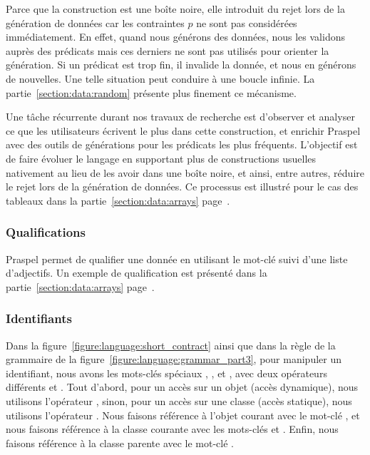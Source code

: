 Parce que la construction  est une boîte noire, elle introduit du rejet
lors de la génération de données car les contraintes $p$ ne sont pas considérées
immédiatement. En effet, quand nous générons des données, nous les validons
auprès des prédicats mais ces derniers ne sont pas utilisés pour orienter la
génération. Si un prédicat est trop fin, il invalide la donnée, et nous en
générons de nouvelles. Une telle situation peut conduire à une boucle infinie.
La partie~\ref{section:data:random} présente plus finement ce mécanisme.

Une tâche récurrente durant nos travaux de recherche est d'observer et analyser
ce que les utilisateurs écrivent le plus dans cette construction, et enrichir
Praspel avec des outils de générations pour les prédicats les plus fréquents.
L'objectif est de faire évoluer le langage en supportant plus de constructions
usuelles nativement au lieu de les avoir dans une boîte noire, et ainsi, entre
autres, réduire le rejet lors de la génération de données. Ce processus est
illustré pour le cas des tableaux dans la partie~\ref{section:data:arrays}
page~\pageref{section:data:arrays}.

\subsubsection{Qualifications}

Praspel permet de qualifier une donnée en utilisant le mot-clé  suivi
d'une liste d'adjectifs. Un exemple de qualification est présenté dans la
partie~\ref{section:data:arrays} page~\pageref{section:data:arrays}.

\subsubsection{Identifiants}

Dans la figure~\ref{figure:language:short_contract} ainsi que dans la règle
 de la grammaire de la
figure~\ref{figure:language:grammar_part3}, pour manipuler un identifiant, nous
avons les mots-clés spéciaux , ,  et
, avec deux opérateurs différents \code{->} et \code{::}. Tout
d'abord, pour un accès sur un objet (accès dynamique), nous utilisons
l'opérateur \code{->}, sinon, pour un accès sur une classe (accès statique),
nous utilisons l'opérateur \code{::}. Nous faisons référence à l'objet courant
avec le mot-clé , et nous faisons référence à la classe courante avec
les mots-clés  et . Enfin, nous faisons référence à la
classe parente avec le mot-clé .

